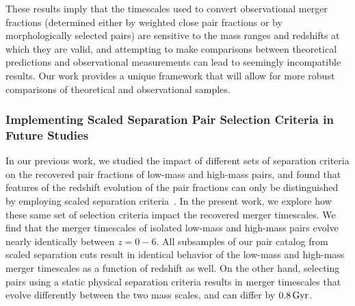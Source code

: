 \documentclass[twocolumn,linenumbers]{aastex631}
\begin{document}
            These results imply that the timescales used to convert observational merger fractions (determined either by weighted close pair fractions or by morphologically selected pairs) are sensitive to the mass ranges and redshifts at which they are valid, and attempting to make comparisons between theoretical predictions and observational measurements can lead to seemingly incompatible results. 
            Our work provides a unique framework that will allow for more robust comparisons of theoretical and observational samples. 

        \subsubsection{Implementing Scaled Separation Pair Selection Criteria in Future Studies}
            In our previous work, we studied the impact of different sets of separation criteria on the recovered pair fractions of low-mass and high-mass pairs, and found that features of the redshift evolution of the pair fractions can only be distinguished by employing scaled separation criteria~\citep{Chamberlain2024}. 
            In the present work, we explore how these same set of selection criteria impact the recovered merger timescales. 
            We find that the merger timescales of isolated low-mass and high-mass pairs evolve nearly identically between $z=0-6$.
            All subsamples of our pair catalog from scaled separation cuts result in identical behavior of the low-mass and high-mass merger timescales as a function of redshift as well. 
            On the other hand, selecting pairs using a static physical separation criteria results in merger timescales that evolve differently between the two mass scales, and can differ by $0.8\mathrm{\,Gyr}$. 
            
\end{document}

